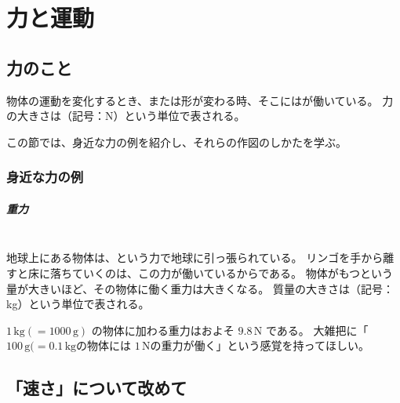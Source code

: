 \chapter{力と運動}

\section{力のこと}

物体の運動を変化するとき、または形が変わる時、そこにはが働いている。
力の大きさは（記号：$\mathrm{N}$）という単位で表される。

この節では、身近な力の例を紹介し、それらの作図のしかたを学ぶ。

\subsection{身近な力の例}

\paragraph{重力}
\mbox{}\\
\indent
地球上にある物体は、という力で地球に引っ張られている。
リンゴを手から離すと床に落ちていくのは、この力が働いているからである。
物体がもつという量が大きいほど、その物体に働く重力は大きくなる。
質量の大きさは（記号：kg）という単位で表される。

$1\,\mathrm{kg} (= 1000\,\mathrm{g})$ の物体に加わる重力はおよそ $9.8\,\mathrm{N}$ である。
大雑把に「$100\,\mathrm{g} (= 0.1\,\mathrm{kg}$の物体には $1\,\mathrm{N}$の重力が働く」という感覚を持ってほしい。

\section{「速さ」について改めて}


